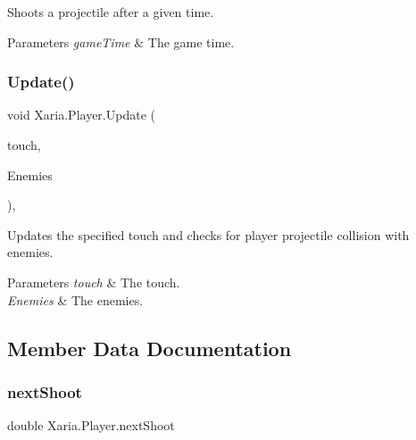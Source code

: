 Shoots a projectile after a given time. 


\begin{DoxyParams}{Parameters}
{\em game\+Time} & The game time.\\
\hline
\end{DoxyParams}
\mbox{\label{classXaria_1_1Player_adc33765b2f4761f7722299cc880f376f}} 
\subsubsection{\texorpdfstring{Update()}{Update()}}
{\footnotesize\ttfamily void Xaria.\+Player.\+Update (\begin{DoxyParamCaption}\item[{Touch\+Collection}]{touch,  }\item[{ref List$<$ List$<$ Enemy $>$$>$}]{Enemies }\end{DoxyParamCaption})\hspace{0.3cm}{\ttfamily [inline]}, {\ttfamily [package]}}



Updates the specified touch and checks for player projectile collision with enemies. 


\begin{DoxyParams}{Parameters}
{\em touch} & The touch.\\
\hline
{\em Enemies} & The enemies.\\
\hline
\end{DoxyParams}


\subsection{Member Data Documentation}
\mbox{\label{classXaria_1_1Player_afdb434cf55e3817ee1f6949c0fb71ee3}} 
\subsubsection{\texorpdfstring{next\+Shoot}{nextShoot}}
{\footnotesize\ttfamily double Xaria.\+Player.\+next\+Shoot\hspace{0.3cm}{\ttfamily [package]}}

